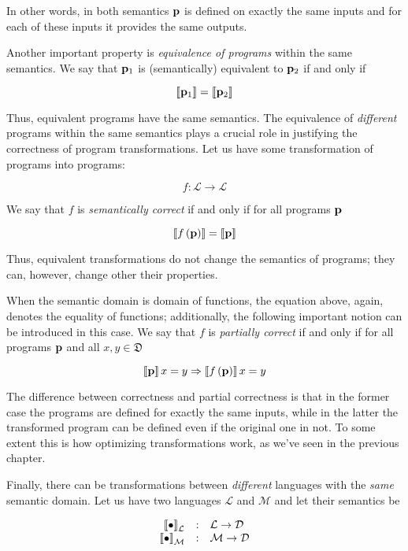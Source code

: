 In other words, in both semantics $\mathbf{p}$ is defined on exactly the same inputs and for each of these inputs it provides the same outputs.

Another important property is \emph{equivalence of programs} within the same semantics. We say that $\mathbf{p}_1$ is (semantically) equivalent to $\mathbf{p}_2$ if
and only if

\[
\llbracket{\mathbf{p}_1}\rrbracket=\llbracket{\mathbf{p}_2}\rrbracket
\]

Thus, equivalent programs have the same semantics. The equivalence of \emph{different} programs within the same semantics plays a crucial
role in justifying the correctness of program transformations. Let us have some transformation of programs into programs:

\[
f : \mathcal{L}\to\mathcal{L}
\]

We say that $f$ is \emph{semantically correct} if and only if for all programs $\mathbf{p}$

\[
\llbracket{f\,(\mathbf{p})}\rrbracket=\llbracket{\mathbf{p}}\rrbracket
\]

Thus, equivalent transformations do not change the semantics of programs; they can, however, change other their properties.

When the semantic domain is domain of functions, the equation above, again, denotes the equality of functions; additionally,
the following important notion can be introduced in this case. We say that $f$ is \emph{partially correct} if and only if
for all programs $\mathbf{p}$ and all $x, y\in\mathfrak{D}$

\[
\llbracket{\mathbf{p}}\rrbracket\,x=y\Rightarrow\llbracket{f\,(\mathbf{p})}\rrbracket\,x=y
\]

The difference between correctness and partial correctness is that in the former case the programs are defined for exactly the same inputs,
while in the latter the transformed program can be defined even if the original one in not. To some extent this is how
optimizing transformations work, as we've seen in the previous chapter.

Finally, there can be transformations between \emph{different} languages with the \emph{same} semantic domain. Let us have two languages $\mathcal{L}$ and $\mathcal{M}$
and let their semantics be

\[
\begin{array}{rcl}
  \sembr{\bullet}^\ph_\mathcal{L} & : & \mathcal{L}\to\mathcal{D}\\
  \sembr{\bullet}^\ph_\mathcal{M} & : & \mathcal{M}\to\mathcal{D}
\end{array}
\]

